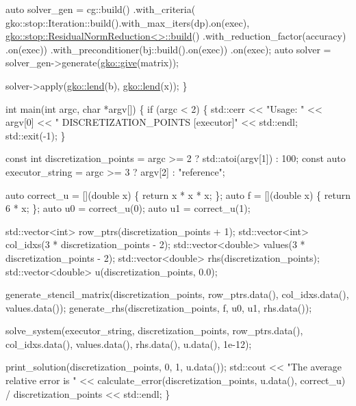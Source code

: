 \begin{DoxyCodeInclude}
    \textcolor{keyword}{auto} solver\_gen =
        cg::build()
            .with\_criteria(
                gko::stop::Iteration::build().with\_max\_iters(dp).on(exec),
                \hyperlink{classgko_1_1stop_1_1ResidualNormReduction}{gko::stop::ResidualNormReduction<>::build}()
                    .with\_reduction\_factor(accuracy)
                    .on(exec))
            .with\_preconditioner(bj::build().on(exec))
            .on(exec);
    \textcolor{keyword}{auto} solver = solver\_gen->generate(\hyperlink{namespacegko_acbd3fd6d07e498892881e8e2ab0b4167}{gko::give}(matrix));

    solver->apply(\hyperlink{namespacegko_aa8cb4876b72e5e1036ea9575443c439b}{gko::lend}(b), \hyperlink{namespacegko_aa8cb4876b72e5e1036ea9575443c439b}{gko::lend}(x));
\}


\textcolor{keywordtype}{int} main(\textcolor{keywordtype}{int} argc, \textcolor{keywordtype}{char} *argv[])
\{
    \textcolor{keywordflow}{if} (argc < 2) \{
        std::cerr << \textcolor{stringliteral}{"Usage: "} << argv[0] << \textcolor{stringliteral}{" DISCRETIZATION\_POINTS [executor]"}
                  << std::endl;
        std::exit(-1);
    \}

    \textcolor{keyword}{const} \textcolor{keywordtype}{int} discretization\_points = argc >= 2 ? std::atoi(argv[1]) : 100;
    \textcolor{keyword}{const} \textcolor{keyword}{auto} executor\_string = argc >= 3 ? argv[2] : \textcolor{stringliteral}{"reference"};

    \textcolor{keyword}{auto} correct\_u = [](\textcolor{keywordtype}{double} x) \{ \textcolor{keywordflow}{return} x * x * x; \};
    \textcolor{keyword}{auto} f = [](\textcolor{keywordtype}{double} x) \{ \textcolor{keywordflow}{return} 6 * x; \};
    \textcolor{keyword}{auto} u0 = correct\_u(0);
    \textcolor{keyword}{auto} u1 = correct\_u(1);

    std::vector<int> row\_ptrs(discretization\_points + 1);
    std::vector<int> col\_idxs(3 * discretization\_points - 2);
    std::vector<double> values(3 * discretization\_points - 2);
    std::vector<double> rhs(discretization\_points);
    std::vector<double> u(discretization\_points, 0.0);

    generate\_stencil\_matrix(discretization\_points, row\_ptrs.data(),
                            col\_idxs.data(), values.data());
    generate\_rhs(discretization\_points, f, u0, u1, rhs.data());

    solve\_system(executor\_string, discretization\_points, row\_ptrs.data(),
                 col\_idxs.data(), values.data(), rhs.data(), u.data(), 1e-12);

    print\_solution(discretization\_points, 0, 1, u.data());
    std::cout << \textcolor{stringliteral}{"The average relative error is "}
              << calculate\_error(discretization\_points, u.data(), correct\_u) /
                     discretization\_points
              << std::endl;
\}
\end{DoxyCodeInclude}
 